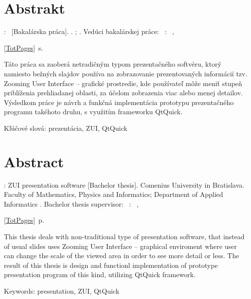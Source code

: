 \chapter*{Abstrakt}

\authorAbstract: \thesisTitle\ [Bakalárska práca]. \university. \faculty; \educationalDepartment. Vedúci bakalárskej práce: \advisor\ \place: \facultyShort\ \universityShort, \date. \ref{TotPages}~s.

\bigskip

Táto práca sa zaoberá netradičným typom prezentačného softvéru, ktorý namiesto bežných slajdov používa na zobrazovanie prezentovaných informácií tzv. Zooming User Interface -- grafické prostredie, kde používateľ môže meniť stupeň priblíženia prehliadanej oblasti, za účelom zobrazenia viac alebo menej detailov. Výsledkom práce je návrh a funkčná implementácia prototypu prezentačného programu takéhoto druhu, s využitím frameworku QtQuick.

\bigskip

Kľúčové slová: prezentácia, ZUI, QtQuick

\chapter*{Abstract}

\authorAbstract: ZUI presentation software [Bachelor thesis]. Comenius University in Bratislava. Faculty of Mathematics, Physics and Informatics; Department of Applied Informatics
. Bachelor thesis supervisor: \advisor\ \place: \facultyShort\ \universityShort, \date. \ref{TotPages}~p.

\bigskip

This thesis deals with non-traditional type of presentation software, that instead of usual slides uses Zooming User Interface -- graphical enviroment where user can change the scale of the viewed area in order to see more detail or less. The result of this thesis is design and functionl implementation of prototype presentation program of this kind, utilizing QtQuick framework.

\bigskip

Keywords: presentation, ZUI, QtQuick